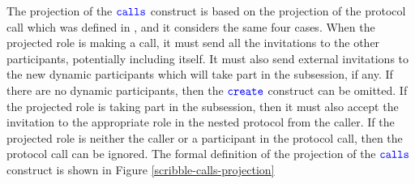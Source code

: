 \documentclass[12pt,twoside]{report}
\begin{document}
The projection of the ${\color{blue}\mathtt{calls}}$ construct is based on the projection of the protocol call which was defined in \cite{nestedprotocols}, and it considers the same four cases. When the projected role is making a call, it must send all the invitations to the other participants, potentially including itself. It must also send external invitations to the new dynamic participants which will take part in the subsession, if any. If there are no dynamic participants, then the ${\color{blue}\mathtt{create}}$ construct can be omitted. If the projected role is taking part in the subsession, then it must also accept the invitation to the appropriate role in the nested protocol from the caller. If the projected role is neither the caller or a participant in the protocol call, then the protocol call can be ignored. The formal definition of the projection of the ${\color{blue}\mathtt{calls}}$ construct is shown in Figure \ref{scribble-calls-projection}\\
 
 
 
 
 
\end{document}
